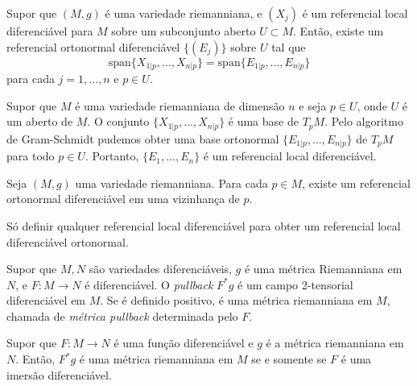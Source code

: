 \begin{proposicao}
	Supor que $(M,g)$ é uma variedade riemanniana, e $(X_j)$ é um referencial local diferenciável para $M$ sobre um subconjunto aberto $U \subset M$. Então, existe um referencial ortonormal diferenciável $\{ (E_j)\}$ sobre $U$ tal que
	\begin{equation*}
		\text{span} \{ X_{1|p}, \ldots, X_{n|p} \} = \text{span} \{ E_{1|p}, \ldots, E_{n|p} \}
	\end{equation*}
	para cada $ j=1, \ldots, n $ e $p \in U$.
\end{proposicao}

\begin{demonstracao}
	Supor que $M$ é uma variedade riemanniana de dimensão $n$ e seja $p \in U$, onde $U$ é um aberto de $M$. O conjunto $\{ X_{1|p},\ldots,X_{n|p} \}$ é uma base de $T_pM$. Pelo algoritmo de Gram-Schmidt pudemos obter uma base ortonormal $\{ E_{1|p},\ldots,E_{n|p} \}$ de $T_pM$ para todo $p \in U$. Portanto, $\{ E_1,\ldots,E_n \}$ é um referencial local diferenciável.
\end{demonstracao}

\begin{corolario}
	Seja $(M,g)$ uma variedade riemanniana. Para cada $p \in M$, existe um referencial ortonormal diferenciável em uma vizinhança de $p$.
\end{corolario}

\begin{demonstracao}
	Só definir qualquer referencial local diferenciável para obter um referencial local diferenciável ortonormal.
\end{demonstracao}






\begin{definicao}\label{metrica_pullback}
	Supor que $M,N$ são variedades diferenciáveis, $g$ é uma métrica Riemanniana em $N$, e $F: M \rightarrow N$ é diferenciável. O \emph{pullback} $F^* g$ é um campo 2-tensorial diferenciável em $M$. Se é definido positivo, é uma métrica riemanniana em $M$, chamada de \emph{métrica pullback} determinada pelo $F$.
\end{definicao}

\begin{proposicao}
	Supor que $F: M \rightarrow N$ é uma função diferenciável e $g$ é a métrica riemanniana em $N$. Então, $F^* g$ é uma métrica riemanniana em $M$ se e somente se $F$ é uma imersão diferenciável.
\end{proposicao}

